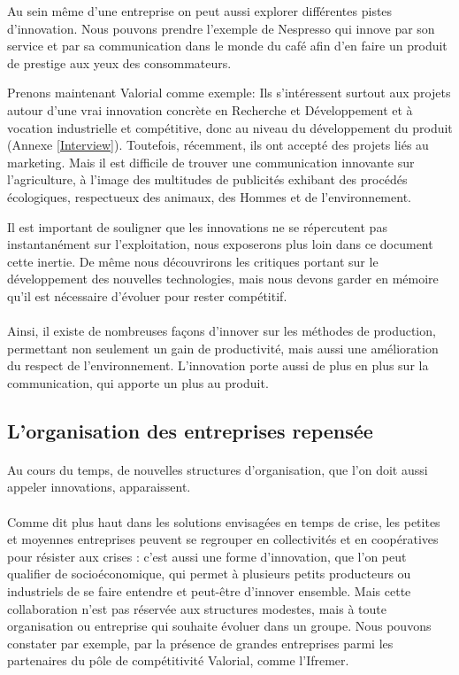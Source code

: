 \documentclass[a4paper,12pt]{report}
\begin{document}
			Au sein même d’une entreprise on peut aussi explorer différentes pistes d'innovation. Nous pouvons prendre l’exemple de Nespresso qui innove par son service et par sa communication dans le monde du café afin d’en faire un produit de prestige aux yeux des consommateurs.
			
			Prenons maintenant Valorial comme exemple: Ils s'intéressent surtout aux projets autour d'une vrai innovation concrète en Recherche et Développement et à vocation industrielle et compétitive, donc au niveau du développement du produit (Annexe \ref{Interview}). Toutefois, récemment, ils ont accepté des projets liés au marketing. Mais il est difficile de trouver une communication innovante sur l'agriculture, à l'image des multitudes de publicités exhibant des procédés écologiques, respectueux des animaux, des Hommes et de l'environnement. 
			
			Il est important de souligner que les innovations ne se répercutent pas instantanément sur l'exploitation, nous exposerons plus loin dans ce document cette inertie. De même nous découvrirons les critiques portant sur le développement des nouvelles technologies, mais nous devons garder en mémoire qu’il est nécessaire d’évoluer pour rester compétitif.
			
		\paragraph{}Ainsi, il existe de nombreuses façons d'innover sur les méthodes de production, permettant non seulement un gain de productivité, mais aussi une amélioration du respect de l'environnement. L'innovation porte aussi de plus en plus sur la communication, qui apporte un plus au produit.
			
			
		\subsection{L'organisation des entreprises repensée}
			\paragraph{}Au cours du temps, de nouvelles structures d’organisation, que l’on doit aussi appeler innovations, apparaissent.
			
			\paragraph{}Comme dit plus haut dans les solutions envisagées en temps de crise, les petites et moyennes entreprises peuvent se regrouper en collectivités et en coopératives pour résister aux crises : c’est aussi une forme d’innovation, que l’on peut qualifier de socioéconomique, qui permet à plusieurs petits producteurs ou industriels de se faire entendre et peut-être d’innover ensemble. 
			Mais cette collaboration n’est pas réservée aux structures modestes, mais à toute organisation ou entreprise qui souhaite évoluer dans un groupe. Nous pouvons constater par exemple, par la présence de grandes entreprises parmi les partenaires du pôle de compétitivité Valorial, comme l’Ifremer.
			
\end{document}
